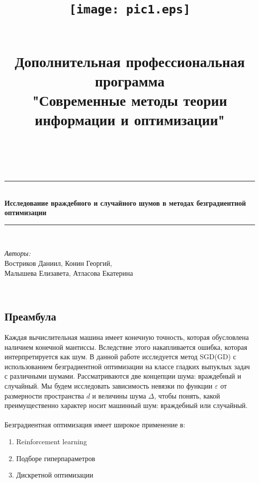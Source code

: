 \documentclass{article}
\title{
\begin{figure}[!ht]
\begin{center}
\texttt{[image: pic1.eps]}\label{figure1}
\end{center}
\end{figure}\\ 
Дополнительная профессиональная программа\\ "Современные методы теории информации и оптимизации"}
\author{\\}
\begin{document}
    \maketitle
    \thispagestyle{empty}
	\begin{center}
		\rule{\linewidth}{0.5mm} \\[0.4cm]
	{ \Huge\bfseries Исследование враждебного и случайного шумов в методах безградиентной оптимизации\\  [0.4cm] }
		\rule{\linewidth}{0.5mm} \\[0.4cm]
	\end{center}	
	
    \begin{minipage}{0.6\textwidth}
	\begin{flushleft} \large
		\emph{Авторы:}\\
		Востриков Даниил, Конин Георгий,\\ Малышева Елизавета, Атласова Екатерина
	\end{flushleft}
\end{minipage}
\begin{center}
\end{center}
\\
\newpage 
\begin{center}
\section*{Преамбула}
\end{center}
Каждая вычислительная машина имеет конечную точность, которая обусловлена наличием конечной мантиссы. Вследствие этого накапливается ошибка, которая интерпретируется как шум.
В данной работе исследуется метод SGD(GD) с использованием безградиентной оптимизации на классе гладких выпуклых задач с различными шумами. Рассматриваются две концепции шума: враждебный и случайный. Мы будем исследовать зависимость невязки по функции $\varepsilon$  от размерности пространства $d$ и величины шума $\Delta$, чтобы понять, какой преимущественно характер носит машинный шум: враждебный или случайный.\\
\\
Безградиентная оптимизация имеет широкое применение в:
\begin{enumerate} 
        \item Reinforcement learning
        \item Подборе гиперпараметров
        \item Дискретной оптимизации
    \end{enumerate} 
\end{document}
